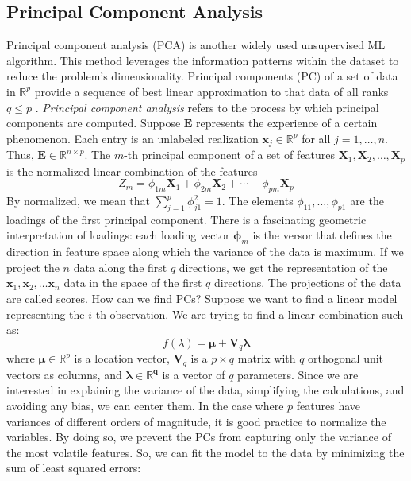 \subsection{Principal Component Analysis}
\label{subsec:PCA}
Principal component analysis (PCA) is another widely used unsupervised ML algorithm. This method leverages the information patterns within the dataset to reduce the problem's dimensionality. Principal components (PC) of a set of data in $\mathbb{R}^p$ provide a sequence of best linear approximation to that data of all ranks $q\le p$ \cite{james_introduction_2021, tibshirani_elements_2008}. \emph{Principal component analysis} refers to the process by which principal components are computed. Suppose $\mathbf{E}$ represents the experience of a certain phenomenon. Each entry is an unlabeled realization $\mathbf{x}_j \in \mathbb{R}^p$ for all $j=1,\dots,n$. Thus, $\mathbf{E} \in \mathbb{R}^{n\times p}$. The $m$-th principal component of a set of features $\mathbf{X}_1, \mathbf{X}_2, \dots, \mathbf{X}_p$ is the normalized linear combination of the features
\begin{equation}
    \label{eq:firstPC}
    Z_m=\phi_{1m} \mathbf{X}_1+\phi_{2m} \mathbf{X}_2+\cdots+\phi_{pm} \mathbf{X}_p
\end{equation}
By normalized, we mean that $\sum_{j=1}^p\phi_{j1}^2=1$. The elements $\phi_{11},\dots,\phi_{p1}$ are the loadings of the first principal component. There is a fascinating geometric interpretation of loadings: each loading vector $\bm{\phi}_m$ is the versor that defines the direction in feature space along which the variance of the data is maximum. If we project the $n$ data along the first $q$ directions, we get the representation of the $\mathbf{x}_1, \mathbf{x}_2, \dots \mathbf{x}_n$ data in the space of the first $q$ directions. The projections of the data are called scores. How can we find PCs? Suppose we want to find a linear model representing the $i$-th observation. We are trying to find a linear combination such as:
\begin{equation}
    \label{eq:pcaf}
    f(\lambda)=\bm{\mu}+\mathbf{V}_q\bm{\lambda}
\end{equation}
where $\bm{\mu}\in \mathbb{R}^p$ is a location vector, $\mathbf{V}_q$ is a $p\times q$ matrix with $q$ orthogonal unit vectors as columns, and $\bm{\lambda \in \mathbb{R}^q}$ is a vector of $q$ parameters. Since we are interested in explaining the variance of the data, simplifying the calculations, and avoiding any bias, we can center them. In the case where $p$ features have variances of different orders of magnitude, it is good practice to normalize the variables. By doing so, we prevent the PCs from capturing only the variance of the most volatile features. So, we can fit the model to the data by minimizing the sum of least squared errors:
